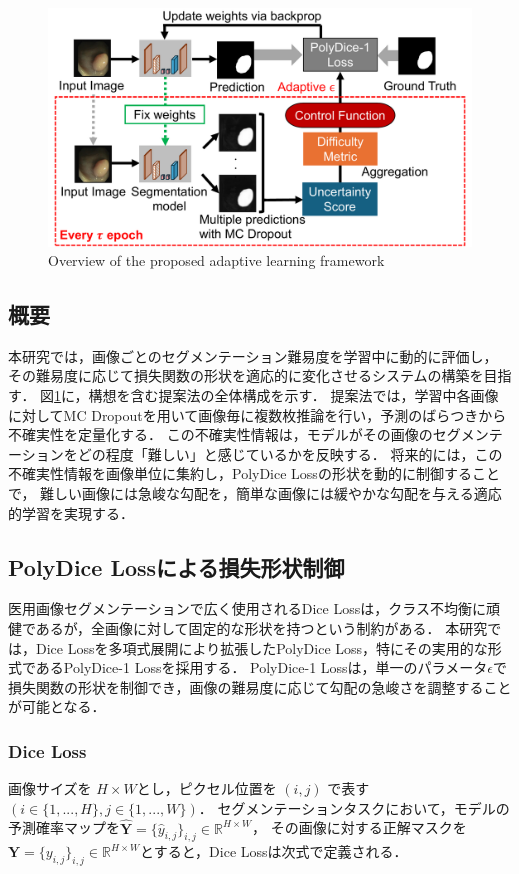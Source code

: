 \documentclass[10pt, a4paper, twocolumn]{jarticle}
\begin{document}
\begin{figure}
  \includegraphics[width=\columnwidth]{figure/method.pdf}
  \caption{Overview of the proposed adaptive learning framework}
  \label{method}
\end{figure}

\subsection{概要}
本研究では，画像ごとのセグメンテーション難易度を学習中に動的に評価し，
その難易度に応じて損失関数の形状を適応的に変化させるシステムの構築を目指す．
図\ref{method}に，構想を含む提案法の全体構成を示す．
提案法では，学習中各画像に対してMC Dropoutを用いて画像毎に複数枚推論を行い，予測のばらつきから不確実性を定量化する．
この不確実性情報は，モデルがその画像のセグメンテーションをどの程度「難しい」と感じているかを反映する．
将来的には，この不確実性情報を画像単位に集約し，PolyDice Lossの形状を動的に制御することで，
難しい画像には急峻な勾配を，簡単な画像には緩やかな勾配を与える適応的学習を実現する．

\subsection{PolyDice Loss\cite{polydice}による損失形状制御}
医用画像セグメンテーションで広く使用されるDice Lossは，クラス不均衡に頑健であるが，全画像に対して固定的な形状を持つという制約がある．
本研究では，Dice Lossを多項式展開により拡張したPolyDice Loss\cite{polydice}，特にその実用的な形式であるPolyDice-1 Lossを採用する．
PolyDice-1 Lossは，単一のパラメータ$\epsilon$で損失関数の形状を制御でき，画像の難易度に応じて勾配の急峻さを調整することが可能となる．

\subsubsection{Dice Loss}
画像サイズを $H \times W$とし，ピクセル位置を $(i, j)$ で表す$\left(i \in \{1, ..., H\}, j \in \{1, ..., W\}\right)$．
セグメンテーションタスクにおいて，モデルの予測確率マップを$\hat{\mathbf{Y}} = \{\hat{y}_{i,j}\}_{i,j} \in \mathbb R ^ {H \times W}$，
その画像に対する正解マスクを$\mathbf{Y} = \{{y}_{i,j}\}_{i,j} \in \mathbb R ^ {H \times W}$とすると，Dice Lossは次式で定義される．
\end{document}
